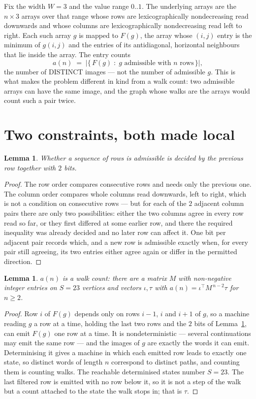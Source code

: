 \documentclass[11pt,a4paper]{article}
\theoremstyle{plain}
\newtheorem{lemma}[theorem]{Lemma}
\theoremstyle{definition}
\begin{document}
Fix the width $W=3$ and the value range $0..1$. The underlying arrays are the
$n\times3$ arrays over that range whose rows are lexicographically nondecreasing read downwards
and whose columns are lexicographically nondecreasing read left to right. Each such array $g$
is mapped to $F(g)$, the array whose $(i,j)$ entry is the minimum of $g(i,j)$ and the entries
of its antidiagonal, horizontal neighbours that lie inside the array. The entry counts
\[
a(n)\;=\;\bigl|\{\,F(g)\;:\;g\text{ admissible with }n\text{ rows}\,\}\bigr|,
\]
the number of DISTINCT images --- not the number of admissible $g$. This is what makes the
problem different in kind from a walk count: two admissible arrays can have the same image, and
the graph whose walks are the arrays would count such a pair twice.

\section{Two constraints, both made local}

\begin{lemma}\label{lem:local}
Whether a sequence of rows is admissible is decided by the previous row together with
$2$ bits.
\end{lemma}

\begin{proof}
The row order compares consecutive rows and needs only the previous one. The column order
compares whole columns read downwards, left to right, which is not a condition on consecutive
rows --- but for each of the $2$ adjacent column pairs there are only two possibilities:
either the two columns agree in every row read so far, or they first differed at some earlier
row, and there the required inequality was already decided and no later row can affect it. One
bit per adjacent pair records which, and a new row is admissible exactly when, for every pair
still agreeing, its two entries either agree again or differ in the permitted direction.
\end{proof}

\begin{lemma}\label{lem:det}
$a(n)$ is a walk count: there are a matrix $M$ with non-negative integer entries on $S=23$
vertices and vectors $\iota,\tau$ with $a(n)=\iota^{\!\top}M^{\,n-2}\tau$ for $n\ge2$.
\end{lemma}

\begin{proof}
Row $i$ of $F(g)$ depends only on rows $i-1$, $i$ and $i+1$ of $g$, so a machine reading $g$ a
row at a time, holding the last two rows and the $2$ bits of Lemma~\ref{lem:local}, can
emit $F(g)$ one row at a time. It is nondeterministic --- several continuations may emit the
same row --- and the images of $g$ are exactly the words it can emit. Determinising it gives a
machine in which each emitted row leads to exactly one state, so distinct words of length $n$
correspond to distinct paths, and counting them is counting walks. The reachable determinised
states number $S=23$. The last filtered row is emitted with no row below it, so it is not a
step of the walk but a count attached to the state the walk stops in; that is $\tau$.
\end{proof}
\end{document}
